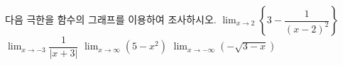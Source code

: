 다음 극한을 함수의 그래프를 이용하여 조사하시오.
 $\displaystyle\lim_{x\to 2}\left\{3-\dfrac{1}{(x-2)^2}\right\}$
 $\displaystyle\lim_{x\to -3}\dfrac{1}{|x+3|}$
 $\displaystyle\lim_{x\to\infty}(5-x^2)$
 $\displaystyle\lim_{x\to -\infty}(-\sqrt{3-x})$
